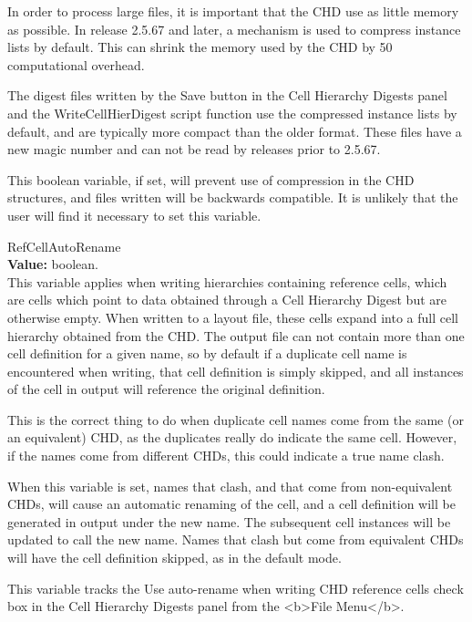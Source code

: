 \begin{description}
In order to process large files, it is important that the CHD use as
little memory as possible.  In release 2.5.67 and later, a mechanism
is used to compress instance lists by default.  This can shrink the
memory used by the CHD by 50%
computational overhead.

The digest files written by the {\cb Save} button in the {\cb Cell
Hierarchy Digests} panel and the {\vt WriteCellHierDigest} script
function use the compressed instance lists by default, and are
typically more compact than the older format.  These files have a new
magic number and can not be read by {\Xic} releases prior to 2.5.67.

This boolean variable, if set, will prevent use of compression in the
CHD structures, and files written will be backwards compatible.  It is
unlikely that the user will find it necessary to set this variable.

\item{\et RefCellAutoRename}\\
{\bf Value:} boolean.\\
This variable applies when writing hierarchies containing reference
cells, which are cells which point to data obtained through a Cell
Hierarchy Digest but are otherwise empty.  When written to a layout
file, these cells expand into a full cell hierarchy obtained from the
CHD.  The output file can not contain more than one cell definition
for a given name, so by default if a duplicate cell name is
encountered when writing, that cell definition is simply skipped, and
all instances of the cell in output will reference the original
definition.

This is the correct thing to do when duplicate cell names come from
the same (or an equivalent) CHD, as the duplicates really do indicate
the same cell.  However, if the names come from different CHDs, this
could indicate a true name clash.

When this variable is set, names that clash, and that come from
non-equivalent CHDs, will cause an automatic renaming of the cell, and
a cell definition will be generated in output under the new name.  The
subsequent cell instances will be updated to call the new name.  Names
that clash but come from equivalent CHDs will have the cell definition
skipped, as in the default mode.

This variable tracks the {\cb Use auto-rename when writing CHD
reference cells} check box in the {\cb Cell Hierarchy Digests} panel
from the <b>File Menu</b>.


\end{description}
